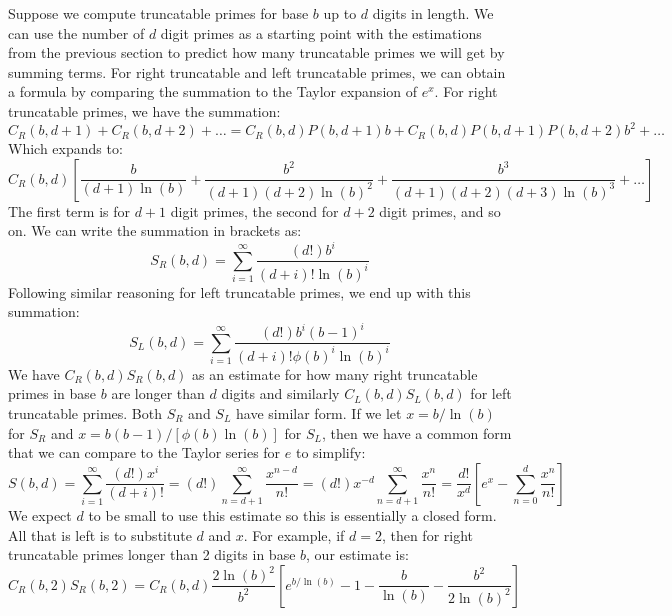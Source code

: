 \documentclass[12pt]{article}
\begin{document}
Suppose we compute truncatable primes for base $b$ up to $d$ digits in length. We can use the number of $d$ digit primes as a starting point with the estimations from the previous section to predict how many truncatable primes we will get by summing terms. For right truncatable and left truncatable primes, we can obtain a formula by comparing the summation to the Taylor expansion of $e^x$. For right truncatable primes, we have the summation:
\begin{equation}
C_R(b,d+1) + C_R(b,d+2) + \ldots = C_R(b,d)P(b,d+1)b + C_R(b,d)P(b,d+1)P(b,d+2)b^2 + \ldots
\end{equation}
Which expands to:
\begin{equation}
C_R(b,d) \left[ \frac{b}{(d+1)\ln(b)} + \frac{b^2}{(d+1)(d+2)\ln(b)^2} + \frac{b^3}{(d+1)(d+2)(d+3)\ln(b)^3} + \ldots \right]
\end{equation}
The first term is for $d+1$ digit primes, the second for $d+2$ digit primes, and so on. We can write the summation in brackets as:
\begin{equation}
S_R(b,d) = \sum_{i=1}^\infty \frac{(d!)b^i}{(d+i)!\ln(b)^i}
\end{equation}
Following similar reasoning for left truncatable primes, we end up with this summation:
\begin{equation}
S_L(b,d) = \sum_{i=1}^\infty \frac{(d!)b^i(b-1)^i}{(d+i)!\phi(b)^i\ln(b)^i}
\end{equation}
We have $C_R(b,d)S_R(b,d)$ as an estimate for how many right truncatable primes in base $b$ are longer than $d$ digits and similarly $C_L(b,d)S_L(b,d)$ for left truncatable primes. Both $S_R$ and $S_L$ have similar form. If we let $x=b/\ln(b)$ for $S_R$ and $x=b(b-1)/[\phi(b)\ln(b)]$ for $S_L$, then we have a common form that we can compare to the Taylor series for $e$ to simplify:
\begin{equation}
S(b,d) = \sum_{i=1}^\infty \frac{(d!)x^i}{(d+i)!} = (d!)\sum_{n=d+1}^\infty \frac{x^{n-d}}{n!} = (d!) x^{-d} \sum_{n=d+1}^\infty \frac{x^n}{n!} = \frac{d!}{x^d} \left[ e^x - \sum_{n=0}^d \frac{x^n}{n!} \right]
\end{equation}
We expect $d$ to be small to use this estimate so this is essentially a closed form. All that is left is to substitute $d$ and $x$. For example, if $d=2$, then for right truncatable primes longer than 2 digits in base $b$, our estimate is:
\begin{equation}
C_R(b,2)S_R(b,2) = C_R(b,d) \frac{2\ln(b)^2}{b^2} \left[ e^{b/\ln(b)} - 1 - \frac{b}{\ln(b)} - \frac{b^2}{2\ln(b)^2} \right]
\end{equation}
\end{document}
